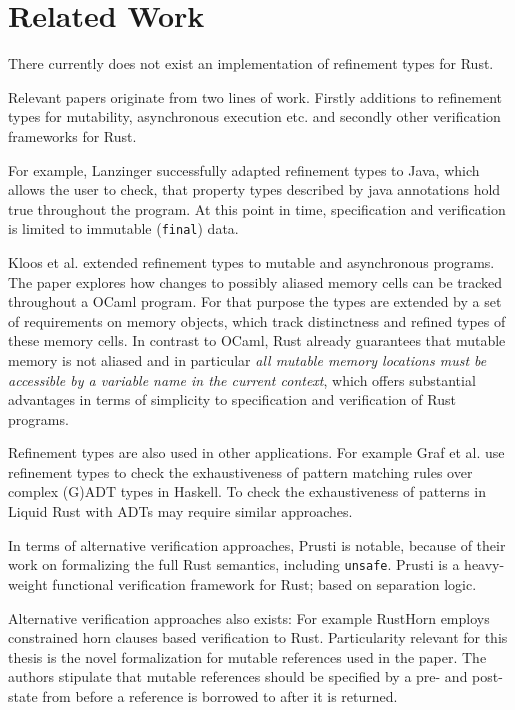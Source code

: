 \documentclass{book}
\newcommand{\code}[1]{\texttt{#1}}
\theoremstyle{definition}
\begin{document}
\chapter{Related Work}

There currently does not exist an implementation of refinement types for Rust.

Relevant papers originate from two lines of work. Firstly additions to refinement types for mutability, asynchronous execution etc. and secondly other verification frameworks for Rust.

For example, Lanzinger \cite{lanzinger_property_2021} successfully adapted refinement types to Java, which allows the user to check, that property types described by java annotations hold true throughout the program. At this point in time, specification and verification is limited to immutable (\code{final}) data.

Kloos et al. \cite{kloos_asynchronous_2015} extended refinement types to mutable and asynchronous programs. The paper explores how changes to possibly aliased memory cells can be tracked throughout a OCaml program. For that purpose the types are extended by a set of requirements on memory objects, which track distinctness and refined types of these memory cells. In contrast to OCaml, Rust already guarantees that mutable memory is not aliased and in particular \textit{all mutable memory locations must be accessible by a variable name in the current context}, which offers substantial advantages in terms of simplicity to specification and verification of Rust programs.

Refinement types are also used in other applications. For example Graf et al. \cite{graf_lower_2020} use refinement types to check the exhaustiveness of pattern matching rules over complex (G)ADT types in Haskell. To check the exhaustiveness of patterns in Liquid Rust with ADTs may require similar approaches.

In terms of alternative verification approaches, Prusti\cite{astrauskas_leveraging_2019} is notable, because of their work on formalizing the full Rust semantics, including \code{unsafe}. Prusti is a heavy-weight functional verification framework for Rust; based on separation logic.

Alternative verification approaches also exists: For example RustHorn\cite{matsushita_rusthorn_2020} employs constrained horn clauses based verification to Rust. Particularity relevant for this thesis is the novel formalization for mutable references used in the paper. The authors stipulate that mutable references should be specified by a pre- and post-state from before a reference is borrowed to after it is returned.
\end{document}
